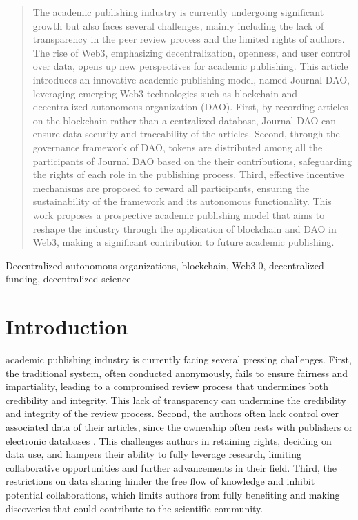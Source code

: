 \documentclass[lettersize,journal]{IEEEtran}
\begin{document}
\begin{abstract}

The academic publishing industry is currently undergoing significant growth but also faces several challenges, mainly including the lack of transparency in the peer review process and the limited rights of authors. The rise of Web3, emphasizing decentralization, openness, and user control over data, opens up new perspectives for academic publishing. This article introduces an innovative academic publishing model, named Journal DAO, leveraging emerging Web3 technologies such as blockchain and decentralized autonomous organization (DAO). First, by recording articles on the blockchain rather than a centralized database, Journal DAO can ensure data security and traceability of the articles. Second, through the governance framework of DAO, tokens are distributed among all the participants of Journal DAO based on the their contributions, safeguarding the rights of each role in the publishing process. Third, effective incentive mechanisms are proposed to reward all participants, ensuring the sustainability of the framework and its autonomous functionality. This work proposes a prospective academic publishing model that aims to reshape the industry through the application of blockchain and DAO in Web3, making a significant contribution to future academic publishing.


\end{abstract}


\begin{IEEEkeywords}
Decentralized autonomous organizations, blockchain, Web3.0, decentralized funding, decentralized science
\end{IEEEkeywords}

\section{Introduction \label{sec:introduction}}


 academic publishing industry is currently facing several pressing challenges. First, the traditional system, often conducted anonymously, fails to ensure fairness and impartiality, leading to a compromised review process that undermines both credibility and integrity. This lack of transparency can undermine the credibility and integrity of the review process. Second,
the authors often lack control over associated data of their articles, since the ownership often rests with publishers or electronic databases \cite{lancaster1995evolution}. This challenges authors in retaining rights, deciding on data use, and hampers their ability to fully leverage research, limiting collaborative opportunities and further advancements in their field. Third, the restrictions on data sharing hinder the free flow of knowledge and inhibit potential collaborations, which limits authors from fully benefiting and making discoveries that could contribute to the scientific community.
\end{document}
